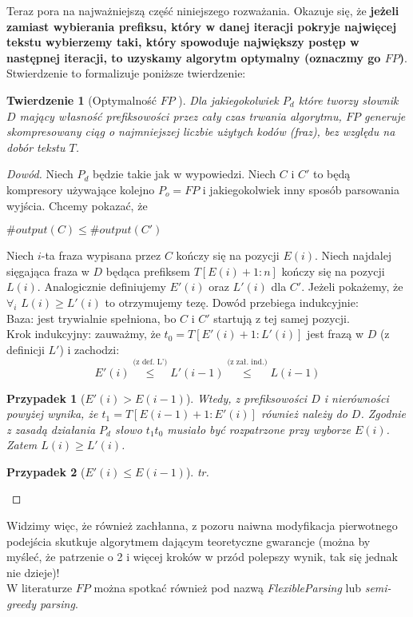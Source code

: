 \documentclass[12pt]{article}
\theoremstyle{plain}
\newtheorem{theorem}{Twierdzenie}[]
\newtheorem{case}{Przypadek}
\begin{document}
Teraz pora na najważniejszą część niniejszego rozważania. Okazuje się, że \textbf{jeżeli zamiast wybierania prefiksu, który w danej iteracji pokryje najwięcej tekstu wybierzemy taki, który spowoduje największy postęp w następnej iteracji, to uzyskamy algorytm optymalny (oznaczmy go $FP$)}. Stwierdzenie to formalizuje poniższe twierdzenie:

\begin{theorem}[Optymalność $FP$ \cite{DBLP:conf/soda/MatiasS99}]
Dla jakiegokolwiek $P_{d}$ które tworzy słownik $D$ mający własność prefiksowości przez cały czas trwania algorytmu, $FP$ generuje skompresowany ciąg o najmniejszej liczbie użytych kodów (fraz), bez względu na dobór tekstu $T$.
\end{theorem}
\begin{proof}[Dowód]
Niech $P_{d}$ będzie takie jak w wypowiedzi. Niech $C$ i $C'$ to będą kompresory używające kolejno $P_{o} = FP$ i jakiegokolwiek inny sposób parsowania wyjścia. Chcemy pokazać, że \begin{center}
$\#output(C) \leq \#output(C')$
\end{center}

Niech $i$-ta fraza wypisana przez $C$ kończy się na pozycji $E(i)$. 
Niech najdalej sięgająca fraza w $D$ będąca prefiksem $T[E(i)+1:n]$ kończy się na pozycji $L(i)$.
Analogicznie definiujemy $E'(i)$ oraz $L'(i)$ dla $C'$.
Jeżeli pokażemy, że $\forall_{i}$ $L(i) \geq L'(i)$ to otrzymujemy tezę. Dowód przebiega indukcyjnie:\\
Baza: jest trywialnie spełniona, bo $C$ i $C'$ startują z tej samej pozycji.\\
Krok indukcyjny: zauważmy, że $t_{0} = T[E'(i)+1:L'(i)]$ jest frazą w $D$ (z definicji $L'$) i zachodzi: 
\[E'(i) \overset{\text{(z def. L')}}{\leq} L'(i-1) \overset{\text{(z zał. ind.)}}{\leq} L(i-1) \]
\begin{case}[$E'(i) > E(i-1)$]
Wtedy, z prefiksowości $D$ i nierówności powyżej wynika, że $t_{1} = T[E(i-1)+1:E'(i)]$ również należy do $D$. Zgodnie z zasadą działania $P_{d}$ słowo $t_{1}t_{0}$ musiało być rozpatrzone przy wyborze $E(i)$. Zatem $L(i) \geq L'(i)$.
\end{case}
\begin{case}[$E'(i) \leq E(i-1)$]
tr.
\end{case}
\end{proof}
Widzimy więc, że również zachłanna, z pozoru naiwna modyfikacja pierwotnego podejścia skutkuje algorytmem dającym teoretyczne gwarancje (można by myśleć, że patrzenie o 2 i więcej kroków w przód polepszy wynik, tak się jednak nie dzieje)! \\ W literaturze $FP$ można spotkać również pod nazwą \textit{FlexibleParsing} lub \textit{semi-greedy parsing}.
\end{document}
